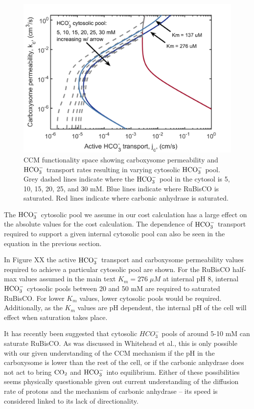 \documentclass[]{article}
\begin{document}
\begin{figure}[h!]
	\includegraphics[width = \textwidth]{HcytoPool.png}
	\caption{CCM functionality space showing carboxysome permeability and ${\rm HCO_3^-}$ transport rates resulting in varying cytosolic ${\rm HCO_3^-}$ pool. Grey dashed lines indicate where the ${\rm HCO_3^-}$ pool in the cytosol is 5, 10, 15, 20, 25, and 30 mM. Blue lines indicate where RuBisCO is saturated. Red lines indicate where carbonic anhydrase is saturated.  }
\end{figure}

The ${\rm HCO_3^-}$ cytosolic pool we assume in our cost calculation has a large effect on the absolute values for the cost calculation. The dependence of ${\rm HCO_3^-}$ transport required to support a given internal cytosolic pool can also be seen in the equation in the previous section.  

In Figure XX the active ${\rm HCO_3^-}$ transport and carboxysome permeability values required to achieve a particular cytosolic pool are shown. For the RuBisCO half-max values assumed in the main text $K_m = 276 \; \mu M$ at internal pH 8, internal ${\rm HCO_3^-}$ cytosolic pools between 20 and 50 mM are required to saturated RuBisCO. For lower $K_m$ values, lower cytosolic pools would be required.
Additionally, as the $K_m$ values are pH dependent, the internal pH of the cell will effect when saturation takes place.

It has recently been suggested that cytosolic ${HCO_3^-}$ pools of around 5-10 mM can saturate RuBisCO. As was discussed in Whitehead et al., this is only possible with our given understanding of the CCM mechanism if the pH in the carboxysome is lower than the rest of the cell, or if the carbonic anhydrase does not act to bring ${\rm CO_2}$ and ${\rm HCO_3^-}$ into equilibrium. Either of these possibilities seems physically questionable given out current understanding of the diffusion rate of protons and the mechanism of carbonic anhydrase -- its speed is considered linked to its lack of directionality.
\end{document}
